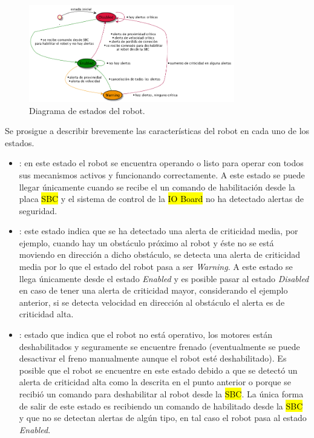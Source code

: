 \documentclass[withindex,glossary]{cam-thesis}
\begin{document}
\begin{figure}[H]
\centering
\includegraphics[width=0.8\textwidth]{images/Diagrama_de_estados_del_robot}
\caption[Diagrama de estados del robot]{Diagrama de estados del robot.}
\end{figure}

Se prosigue a describir brevemente las características del robot en cada uno de los estados.
\begin{itemize}
\item {}: en este estado el robot se encuentra operando o listo para operar con todos sus mecanismos activos y funcionando correctamente. A este estado se puede llegar únicamente cuando se recibe el un comando de habilitación desde la placa \hl{SBC} y el sistema de control de la \hl{IO Board} no ha detectado alertas de seguridad.
\item {}: este estado indica que se ha detectado una alerta de criticidad media, por ejemplo, cuando hay un obstáculo próximo al robot y éste no se está moviendo en dirección a dicho obstáculo, se detecta una alerta de criticidad media por lo que el estado del robot pasa a ser \textit{Warning}. A este estado se llega únicamente desde el estado \textit{Enabled} y es posible pasar al estado \textit{Disabled} en caso de tener una alerta de criticidad mayor, considerando el ejemplo anterior, si se detecta velocidad en dirección al obstáculo el alerta es de criticidad alta.
\item {}: estado que indica que el robot no está operativo, los motores están deshabilitados y seguramente se encuentre frenado (eventualmente se puede desactivar el freno manualmente aunque el robot esté deshabilitado). Es posible que el robot se encuentre en este estado debido a que se detectó un alerta de criticidad alta como la descrita en el punto anterior o porque se recibió un comando para deshabilitar al robot desde la \hl{SBC}. La única forma de salir de este estado es recibiendo un comando de habilitado desde la \hl{SBC} y que no se detectan alertas de algún tipo, en tal caso el robot pasa al estado \textit{Enabled}.
\end{itemize}
\end{document}
